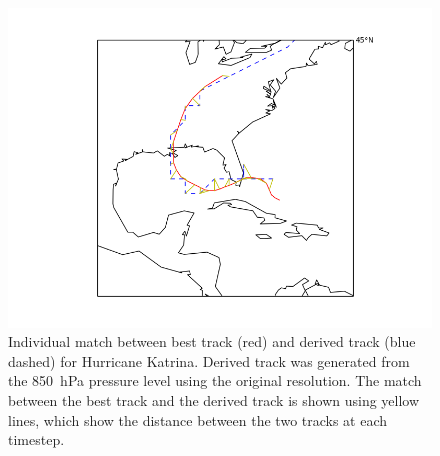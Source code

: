 \documentclass[pdftex,12pt,a4paper]{report}
\begin{document}
\begin{figure}[hbp]
    \centering
    \includegraphics[width=\linewidth]{figures/katrina_individual_match_em7}
    \caption{Individual match between best track (red) and derived track (blue dashed) for Hurricane 
             Katrina. Derived track was generated from the \SI{850}{hPa} pressure level using the
             original resolution. The match between the best track and the derived track is shown using
             yellow lines, which show the distance between the two tracks at each timestep. }
    \label{fig:katrina_individual_match_em7}
\end{figure}
\end{document}
